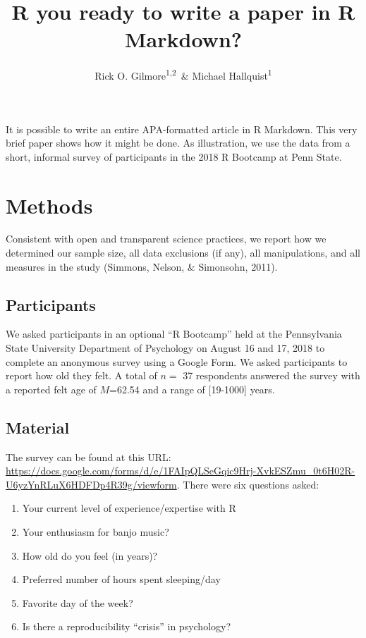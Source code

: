 \documentclass[english,man]{apa6}
\title{R you ready to write a paper in R Markdown?}
\author{Rick O. Gilmore\textsuperscript{1,2}~\& Michael Hallquist\textsuperscript{1}}
\affiliation{
    \vspace{0.5cm}
          \textsuperscript{1} The Pennsylvania State University\\
          \textsuperscript{2} Databrary.org  }
\providecommand{\tightlist}{%
  \setlength{\itemsep}{0pt}\setlength{\parskip}{0pt}}
\theoremstyle{definition}
\theoremstyle{definition}
\theoremstyle{definition}
\theoremstyle{remark}
\begin{document}
\maketitle

\setcounter{secnumdepth}{0}



It is possible to write an entire APA-formatted article in R Markdown.
This very brief paper shows how it might be done. As illustration, we
use the data from a short, informal survey of participants in the 2018 R
Bootcamp at Penn State.

\section{Methods}\label{methods}

Consistent with open and transparent science practices, we report how we
determined our sample size, all data exclusions (if any), all
manipulations, and all measures in the study (Simmons, Nelson, \&
Simonsohn, 2011).

\subsection{Participants}\label{participants}

We asked participants in an optional \enquote{R Bootcamp} held at the
Pennsylvania State University Department of Psychology on August 16 and
17, 2018 to complete an anonymous survey using a Google Form. We asked
participants to report how old they felt. A total of \(n=\) 37
respondents answered the survey with a reported felt age of \(M\)=62.54
and a range of {[}19-1000{]} years.

\subsection{Material}\label{material}

The survey can be found at this URL:
\url{https://docs.google.com/forms/d/e/1FAIpQLSeGqic9Hrj-XvkESZmu_0t6H02R-U6yzYnRLuX6HDFDp4R39g/viewform}.
There were six questions asked:

\begin{enumerate}
\def\labelenumi{\arabic{enumi}.}
\tightlist
\item
  Your current level of experience/expertise with R
\item
  Your enthusiasm for banjo music?
\item
  How old do you feel (in years)?
\item
  Preferred number of hours spent sleeping/day
\item
  Favorite day of the week?
\item
  Is there a reproducibility \enquote{crisis} in psychology?
\end{enumerate}
\end{document}
